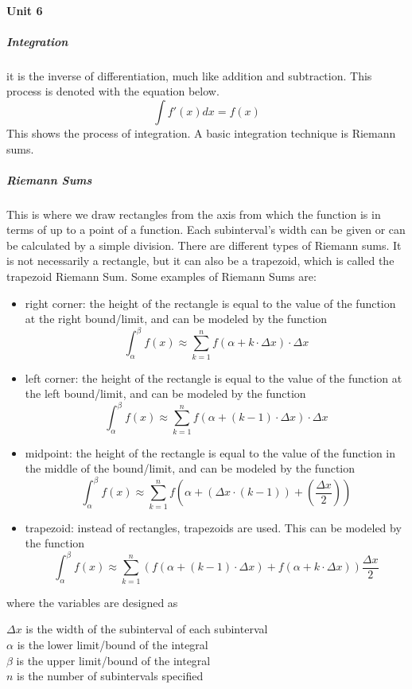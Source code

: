 \documentclass{article} %
\theoremstyle{theorem}
\theoremstyle{definition}
\begin{document}
            \paragraph{Unit 6}
                \subparagraph{Integration}
                    it is the inverse of differentiation, much like addition and subtraction. This process is denoted with the equation below.
                    $$\int f'(x)dx = f(x)$$
                    This shows the process of integration. A basic integration technique is Riemann sums.
                \subparagraph{Riemann Sums}
                    This is where we draw rectangles from the axis from which the function is in terms of up to a point of a function. Each subinterval's width can be given or can be calculated by a simple division. There are different types of Riemann sums.
                    It is not necessarily a rectangle, but it can also be a trapezoid, which is called the trapezoid Riemann Sum.
                    Some examples of Riemann Sums are:
                    \begin{itemize}
                        \item right corner: the height of the rectangle is equal to the value of the function at the right bound/limit, and can be modeled by the function $$\int_\alpha^\beta f(x)\approx \sum_{k=1}^{n}f(\alpha+k \cdot \Delta x)\cdot\Delta x$$
                        \item left corner: the height of the rectangle is equal to the value of the function at the left bound/limit, and can be modeled by the function $$\int_\alpha^\beta f(x) \approx \sum_{k=1}^{n}f(\alpha+(k-1)\cdot \Delta x)\cdot\Delta x$$
                        \item midpoint: the height of the rectangle is equal to the value of the function in the middle of the bound/limit, and can be modeled by the function $$\int_\alpha^\beta f(x)\approx \sum_{k=1}^{n}f(\alpha+(\Delta x\cdot(k-1))+(\frac{\Delta x}{2}))$$
                    \item trapezoid: instead of rectangles, trapezoids are used. This can be modeled by the function $$\int_\alpha^\beta f(x)\approx \sum_{k=1}^{n}(f(\alpha+(k-1)\cdot\Delta x)+f(\alpha+k\cdot\Delta x))\frac{\Delta x}{2}$$
                    \end{itemize}
                    where the variables are designed as
                    \begin{center}
                        $\Delta x$ is the width of the subinterval of each subinterval\\
                        $\alpha$ is the lower limit/bound of the integral\\
                        $\beta$ is the upper limit/bound of the integral\\
                        $n$ is the number of subintervals specified\\
                    \end{center}
\end{document}
